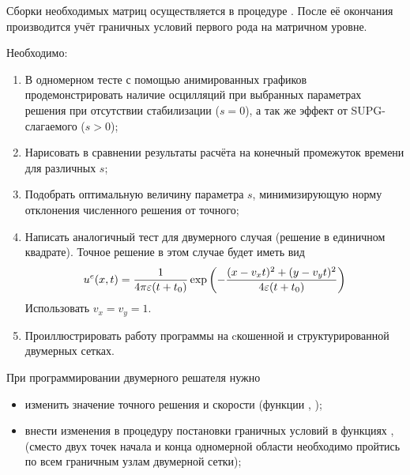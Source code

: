 Сборки необходимых матриц осуществляется в процедуре .
После её окончания производится учёт граничных условий первого рода на матричном уровне.


Необходимо:
\begin{enumerate}
\item В одномерном тесте  с помощью анимированных графиков продемонстрировать наличие осцилляций
      при выбранных параметрах решения при отсутствии стабилизации ($s = 0$), а так же эффект от SUPG-слагаемого ($s > 0$);
\item Нарисовать в сравнении результаты расчёта на конечный промежуток времени для различных $s$;
\item Подобрать оптимальную величину параметра $s$, минимизирующую норму отклонения численного решения от точного;
\item Написать аналогичный тест для двумерного случая (решение в единичном квадрате). Точное решение в этом случае будет иметь вид
$$
u^e(x, t) = \frac{1}{4\pi \varepsilon (t + t_0)} \exp\left(-\frac{(x - v_x t)^2 + (y - v_y t)^2}{4\varepsilon(t+t_0)}\right)
$$
Использовать $v_x = v_y = 1$.
\item Проиллюстрировать работу программы на cкошенной и структурированной двумерных сетках.
\end{enumerate}

При программировании двумерного решателя нужно 
\begin{itemize}
\item изменить значение точного решения и скорости (функции , );
\item внести изменения в процедуру постановки граничных условий в функциях ,  (сместо двух точек начала и конца одномерной области
необходимо пройтись по всем граничным узлам двумерной сетки);
\end{itemize}
